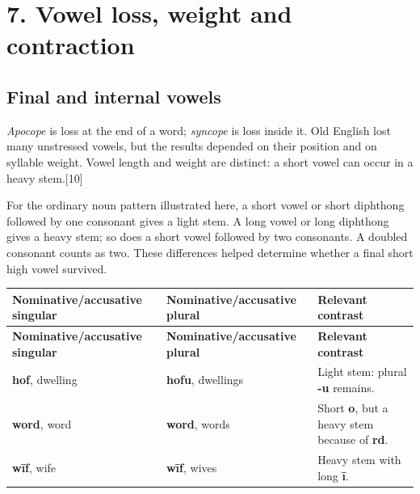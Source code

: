 \section*{7. Vowel loss, weight and contraction}
\subsection*{Final and internal vowels}
\emph{Apocope} is loss at the end of a word; \emph{syncope} is loss inside it. Old English lost many unstressed vowels, but the results depended on their position and on syllable weight. Vowel length and weight are distinct: a short vowel can occur in a heavy stem.[10]\par
For the ordinary noun pattern illustrated here, a short vowel or short diphthong followed by one consonant gives a light stem. A long vowel or long diphthong gives a heavy stem; so does a short vowel followed by two consonants. A doubled consonant counts as two. These differences helped determine whether a final short high vowel survived.\par
\begingroup
\fontsize{10.5}{13.2}\selectfont
\setlength{\LTleft}{0pt}
\setlength{\LTright}{0pt plus 1fil}
\begin{longtable}{@{}>{\raggedright\arraybackslash}p{}>{\raggedright\arraybackslash}p{}>{\raggedright\arraybackslash}p{}@{}}
\toprule
\textbf{Nominative/accusative singular} & \textbf{Nominative/accusative plural} & \textbf{Relevant contrast} \\
\midrule
\endfirsthead
\toprule
\textbf{Nominative/accusative singular} & \textbf{Nominative/accusative plural} & \textbf{Relevant contrast} \\
\midrule
\endhead
\bottomrule
\endfoot
\bottomrule
\endlastfoot
\textbf{hof}, dwelling & \textbf{hofu}, dwellings & Light stem: plural \textbf{-u} remains. \\
\textbf{word}, word & \textbf{word}, words & Short \textbf{o}, but a heavy stem because of \textbf{rd}. \\
\textbf{wīf}, wife & \textbf{wīf}, wives & Heavy stem with long \textbf{ī}. \\
\end{longtable}
